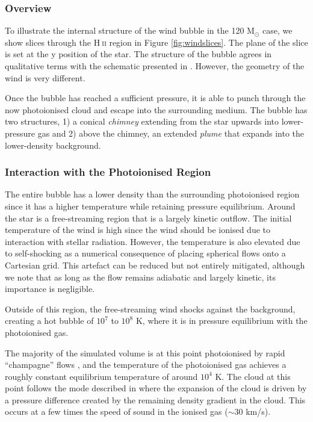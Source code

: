 \documentclass[a4paper,fleqn,usenatbib]{mnras}
\newcommand{\Msolar}{M$_{\odot}$\xspace}
\newcommand{\HII}{H$~$\textsc{ii}\xspace}
\begin{document}
\subsubsection{Overview}
\label{results:evolutionwindbubble:overview}

To illustrate the internal structure of the wind bubble in the 120 \Msolar case, we show slices through the \HII region in Figure \ref{fig:windslices}. The plane of the slice is set at the y position of the star. The structure of the bubble agrees in qualitative terms with the schematic presented in \cite{Weaver1977}. However, the geometry of the wind is very different.

Once the bubble has reached a sufficient pressure, it is able to punch through the now photoionised cloud and escape into the surrounding medium. The bubble has two structures, 1) a conical \textit{chimney} extending from the star upwards into lower-pressure gas and 2) above the chimney, an extended \textit{plume} that expands into the lower-density background.

\subsubsection{Interaction with the Photoionised Region}
\label{results:evolutionwindbubble:interaction}

The entire bubble has a lower density than the surrounding photoionised region since it has a higher temperature while retaining pressure equilibrium. Around the star is a free-streaming region that is a largely kinetic outflow. The initial temperature of the wind is high since the wind should be ionised due to interaction with stellar radiation. However, the temperature is also elevated due to self-shocking as a numerical consequence of placing spherical flows onto a Cartesian grid. This artefact can be reduced but not entirely mitigated, although we note that as long as the flow remains adiabatic and largely kinetic, its importance is negligible.

Outside of this region, the free-streaming wind shocks against the background, creating a hot bubble of $10^7$ to $10^8$ K, where it is in pressure equilibrium with the photoionised gas. 

The majority of the simulated volume is at this point photoionised by rapid ``champagne'' flows \citep{Bodenheimer1979,TenorioTagle1979,Whitworth1979}, and the temperature of the photoionised gas achieves a roughly constant equilibrium temperature of around $10^4$ K. The cloud at this point follows the mode described in \cite{Franco1990} where the expansion of the cloud is driven by a pressure difference created by the remaining density gradient in the cloud. This occurs at a few times the speed of sound in the ionised gas ($\sim 30$ km/s).
\end{document}

